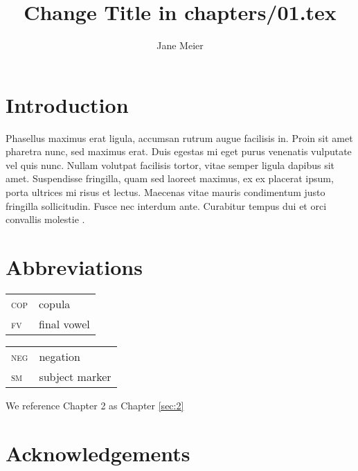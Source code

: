 \documentclass[output=minimal]{../../langscibook}
\title{Change Title in chapters/01.tex}
\author{%
 Jane Meier  \affiliation{University of Eden}
}
\begin{document}
\maketitle

\section{Introduction}
Phasellus maximus erat ligula, accumsan rutrum augue facilisis in. Proin sit amet pharetra nunc, sed maximus erat. Duis egestas mi eget purus venenatis vulputate vel quis nunc. Nullam volutpat facilisis tortor, vitae semper ligula dapibus sit amet. Suspendisse fringilla, quam sed laoreet maximus, ex ex placerat ipsum, porta ultrices mi risus et lectus. Maecenas vitae mauris condimentum justo fringilla sollicitudin. Fusce nec interdum ante. Curabitur tempus dui et orci convallis molestie \citep{Chomsky1957}.

\section*{Abbreviations}
\begin{tabularx}{.45\textwidth}{lX}
\textsc{cop} & copula\\
\textsc{fv} & final vowel\\
\end{tabularx}
\begin{tabularx}{.45\textwidth}{lX}
\textsc{neg} & negation\\
\textsc{sm} & subject marker\\
\end{tabularx}

We reference Chapter 2 as Chapter \ref{sec:2}

\section*{Acknowledgements}

{\sloppy
\printbibliography[heading=subbibliography,notkeyword=this]
}
\end{document}
